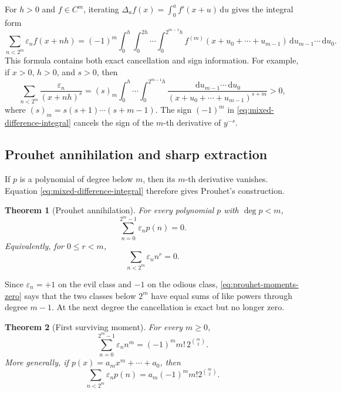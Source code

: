 \documentclass[11pt,oneside]{article}
\newtheorem{theorem}{Theorem}[section]
\theoremstyle{definition}
\theoremstyle{remark}
\newcommand{\dd}{\,\mathrm d}
\newcommand{\eps}{\varepsilon}
\begin{document}
For \(h>0\) and \(f\in C^m\), iterating
\(\Delta_af(x)=\int_0^af'(x+u)\dd u\) gives the integral form
\begin{equation}
  \boxed{
  \sum_{n<2^m}\eps_nf(x+nh)
   =(-1)^m\int_0^h\int_0^{2h}\cdots\int_0^{2^{m-1}h}
       f^{(m)}(x+u_0+\cdots+u_{m-1})
       \dd u_{m-1}\cdots\dd u_0.}                          \label{eq:mixed-difference-integral}
\end{equation}
This formula contains both exact cancellation and sign information.  For example, if
\(x>0\), \(h>0\), and \(s>0\), then
\begin{equation}
  \boxed{
  \sum_{n<2^m}\frac{\eps_n}{(x+nh)^s}
  =(s)_m\int_0^h\cdots\int_0^{2^{m-1}h}
  \frac{\dd u_{m-1}\cdots\dd u_0}
       {(x+u_0+\cdots+u_{m-1})^{s+m}}>0,}                  \label{eq:positive-reciprocal-block}
\end{equation}
where \((s)_m=s(s+1)\cdots(s+m-1)\).  The sign \((-1)^m\) in
\eqref{eq:mixed-difference-integral} cancels the sign of the \(m\)-th derivative of
\(y^{-s}\).

\subsection{Prouhet annihilation and sharp extraction}

If \(p\) is a polynomial of degree below \(m\), then its \(m\)-th derivative vanishes.
Equation \eqref{eq:mixed-difference-integral} therefore gives Prouhet's construction.

\begin{theorem}[Prouhet annihilation]
\label{thm:prouhet-annihilation}
For every polynomial \(p\) with \(\deg p<m\),
\begin{equation}
  \boxed{
  \sum_{n=0}^{2^m-1}\eps_np(n)=0.}                          \label{eq:prouhet-polynomial}
\end{equation}
Equivalently, for \(0\le r<m\),
\begin{equation}
  \sum_{n<2^m}\eps_nn^r=0.                                 \label{eq:prouhet-moments-zero}
\end{equation}
\end{theorem}

Since \(\eps_n=+1\) on the evil class and \(-1\) on the odious class,
\eqref{eq:prouhet-moments-zero} says that the two classes below \(2^m\) have equal sums of
like powers through degree \(m-1\).  At the next degree the cancellation is exact but no
longer zero.

\begin{theorem}[First surviving moment]
\label{thm:first-surviving-moment}
For every \(m\ge0\),
\begin{equation}
  \boxed{
  \sum_{n=0}^{2^m-1}\eps_nn^m=(-1)^m m!\,2^{\binom m2}.}    \label{eq:first-surviving-moment}
\end{equation}
More generally, if \(p(x)=a_mx^m+\cdots+a_0\), then
\begin{equation}
  \sum_{n<2^m}\eps_np(n)=a_m(-1)^m m!2^{\binom m2}.         \label{eq:leading-coefficient-extractor}
\end{equation}
\end{theorem}
\end{document}
